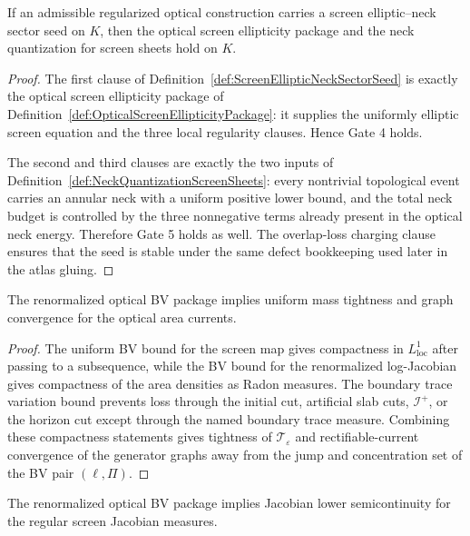 \begin{theorem}\label{thm:ScreenEllipticNeckSectorSeed}
If an admissible regularized optical construction carries a screen elliptic--neck sector seed on $K$, then the optical screen ellipticity package and the neck quantization for screen sheets hold on $K$.
\end{theorem}

\begin{proof}
The first clause of Definition~\ref{def:ScreenEllipticNeckSectorSeed} is exactly the optical screen ellipticity package of Definition~\ref{def:OpticalScreenEllipticityPackage}: it supplies the uniformly elliptic screen equation and the three local regularity clauses. Hence Gate 4 holds.

The second and third clauses are exactly the two inputs of Definition~\ref{def:NeckQuantizationScreenSheets}: every nontrivial topological event carries an annular neck with a uniform positive lower bound, and the total neck budget is controlled by the three nonnegative terms already present in the optical neck energy. Therefore Gate 5 holds as well. The overlap-loss charging clause ensures that the seed is stable under the same defect bookkeeping used later in the atlas gluing.
\end{proof}

\begin{lemma}\label{lem:RenormalizedBVTightness}
The renormalized optical BV package implies uniform mass tightness and graph convergence for the optical area currents.
\end{lemma}

\begin{proof}
The uniform BV bound for the screen map gives compactness in $L^1_{\mathrm{loc}}$ after passing to a subsequence, while the BV bound for the renormalized log-Jacobian gives compactness of the area densities as Radon measures. The boundary trace variation bound prevents loss through the initial cut, artificial slab cuts, $\mathscr I^+$, or the horizon cut except through the named boundary trace measure. Combining these compactness statements gives tightness of $\mathcal T_\varepsilon$ and rectifiable-current convergence of the generator graphs away from the jump and concentration set of the BV pair $(\ell,\Pi)$.
\end{proof}

\begin{lemma}\label{lem:RenormalizedBVJacobianLSC}
The renormalized optical BV package implies Jacobian lower semicontinuity for the regular screen Jacobian measures.
\end{lemma}

